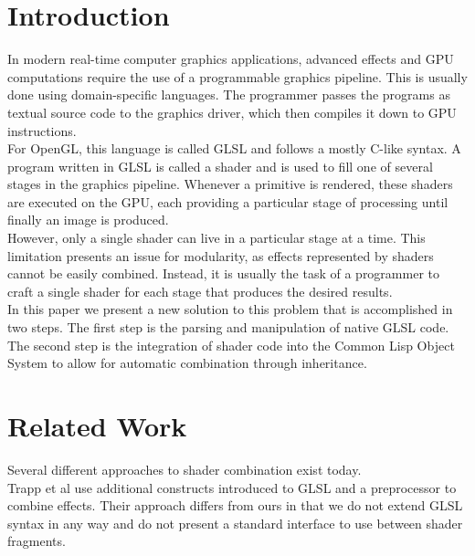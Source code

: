 \documentclass{sig-alternate}
\begin{document}
\printccsdesc

\newpage

\section{Introduction}\label{section:1}
In modern real-time computer graphics applications, advanced effects and GPU computations require the use of a programmable graphics pipeline. This is usually done using domain-specific languages. The programmer passes the programs as textual source code to the graphics driver, which then compiles it down to GPU instructions.\\

For OpenGL, this language is called GLSL\cite{rost2009opengl} and follows a mostly C-like syntax. A program written in GLSL is called a shader and is used to fill one of several stages in the graphics pipeline. Whenever a primitive is rendered, these shaders are executed on the GPU, each providing a particular stage of processing until finally an image is produced. \\

However, only a single shader can live in a particular stage at a time. This limitation presents an issue for modularity, as effects represented by shaders cannot be easily combined. Instead, it is usually the task of a programmer to craft a single shader for each stage that produces the desired results. \\

In this paper we present a new solution to this problem that is accomplished in two steps. The first step is the parsing and manipulation of native GLSL code. The second step is the integration of shader code into the Common Lisp Object System to allow for automatic combination through inheritance.

\section{Related Work}\label{section:2}
Several different approaches to shader combination exist today. \\

Trapp et al\cite{trapp2007automated} use additional constructs introduced to GLSL and a preprocessor to combine effects. Their approach differs from ours in that we do not extend GLSL syntax in any way and do not present a standard interface to use between shader fragments. \\
\end{document}
